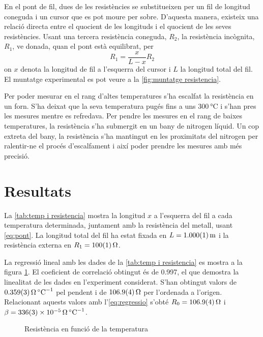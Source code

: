 En el pont de fil, dues de les resistències se substitueixen per un fil de longitud coneguda i un cursor que es pot moure per sobre. D'aquesta manera, existeix una relació directa entre el quocient de les longituds i el quocient de les seves resistències. Usant una tercera resistència coneguda, $R_2$, la resistència incògnita, $R_1$, ve donada, quan el pont està equilibrat, per
\begin{equation}\label{eq:pont}
R_1=\frac{x}{L-x}R_2
\end{equation}
on $x$ denota la longitud de fil a l'esquerra del cursor i $L$ la longitud total del fil. El muntatge experimental es pot veure a la \cref{fig:muntatge resistencia}. 

Per poder mesurar en el rang d'altes temperatures s'ha escalfat la resistència en un forn. S'ha deixat que la seva temperatura pugés fins a uns $\SI{300}{\celsius}$ i s'han pres les mesures mentre es refredava. Per pendre les mesures en el rang de baixes temperatures, la resistència s'ha submergit en un bany de nitrogen líquid. Un cop extreta del bany, la resistència s'ha mantingut en les proximitats del nitrogen per ralentir-ne el procés d'escalfament i així poder prendre les mesures amb més precisió. 

\section{Resultats}
La \cref{tab:temp i resistencia} mostra la longitud $x$ a l'esquerra del fil a cada temperatura determinada, juntament amb la resistència del metall, usant \cref{eq:pont}. La longitud total del fil ha estat fixada en $L=\data{1.000}{0.001}{\meter}$ i la resistència externa en $R_1=\data{100}{1}{\ohm}$.

La regressió lineal amb les dades de la \cref{tab:temp i resistencia} es mostra a la figura \ref{fig:temp v resistencia}. El coeficient de correlació obtingut és de 0.997, el que demostra la linealitat de les dades en l'experiment considerat. S'han obtingut valors de $\data{0.359}{0.003}{\ohm\per\celsius}$ pel pendent i de $\data{106.9}{0.4}{\ohm}$ per l'ordenada a l'origen. Relacionant aquests valors amb l'\cref{eq:regressio} s'obté $R_0=\data{106.9}{0.4}{\ohm}$ i $\beta=\data{336}{3e-5}{\ohm\per\celsius}$.

\begin{figure} [htb]
	\centering
	\small \sffamily
	\caption{Resistència en funció de la temperatura}
	\label{fig:temp v resistencia}
\end{figure}

